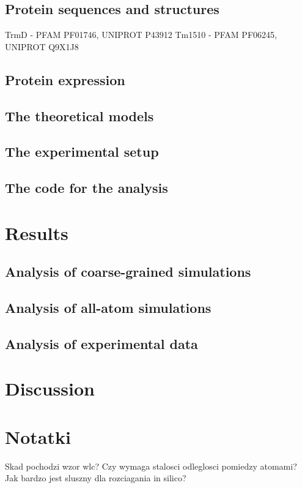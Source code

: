 \documentclass[11pt]{article}
\begin{document}
\subsection{Protein sequences and structures}
\label{subsec:sequences}
TrmD - PFAM PF01746, UNIPROT P43912
Tm1510 - PFAM PF06245, UNIPROT Q9X1J8
\subsection{Protein expression}
\label{subsec:expression}

\subsection{The theoretical models}
\label{subsec:models}

\subsection{The experimental setup}
\label{subsec:experiment}

\subsection{The code for the analysis}
\label{subsec:code}

\section{Results}
\label{sec:results}

\subsection{Analysis of coarse-grained simulations}
\label{subsec:cg}
\subsection{Analysis of all-atom simulations}
\label{subsec:aa}
\subsection{Analysis of experimental data}
\label{subsec:exp}

\section{Discussion}
\label{sec:discussion}

\section{Notatki}
\label{sec:Notatki}
Skad pochodzi wzor wlc?
Czy wymaga stalosci odleglosci pomiedzy atomami?
Jak bardzo jest sluszny dla rozciagania in silico?


 

\end{document}
